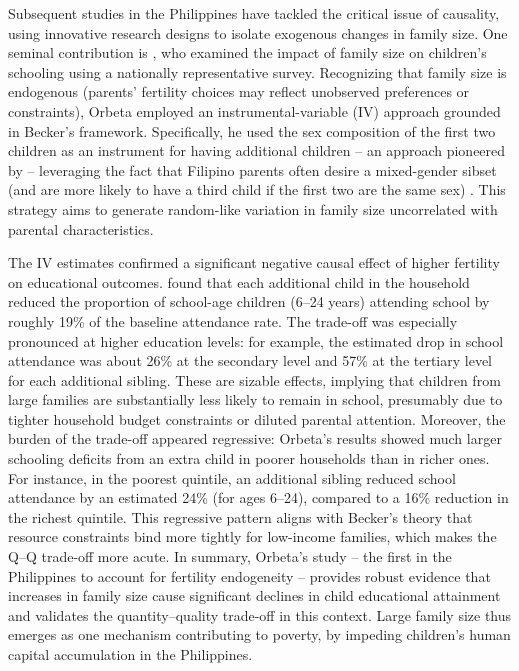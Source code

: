 \documentclass[]{AEA}
\begin{document}
Subsequent studies in the Philippines have tackled the critical issue of
causality, using innovative research designs to isolate exogenous
changes in family size. One seminal contribution is
\citet{orbeta2010number}, who examined the impact of family size on
children's schooling using a nationally representative survey.
Recognizing that family size is endogenous (parents' fertility choices
may reflect unobserved preferences or constraints), Orbeta employed an
instrumental-variable (IV) approach grounded in Becker's framework.
Specifically, he used the sex composition of the first two children as
an instrument for having additional children -- an approach pioneered by
\citet{angrist1996children} -- leveraging the fact that Filipino parents
often desire a mixed-gender sibset (and are more likely to have a third
child if the first two are the same sex) \citep{vicerra2013fertility}.
This strategy aims to generate random-like variation in family size
uncorrelated with parental characteristics.

The IV estimates confirmed a significant negative causal effect of
higher fertility on educational outcomes. \citet{orbeta2010number} found
that each additional child in the household reduced the proportion of
school-age children (6--24 years) attending school by roughly 19\% of
the baseline attendance rate. The trade-off was especially pronounced at
higher education levels: for example, the estimated drop in school
attendance was about 26\% at the secondary level and 57\% at the
tertiary level for each additional sibling. These are sizable effects,
implying that children from large families are substantially less likely
to remain in school, presumably due to tighter household budget
constraints or diluted parental attention. Moreover, the burden of the
trade-off appeared regressive: Orbeta's results showed much larger
schooling deficits from an extra child in poorer households than in
richer ones. For instance, in the poorest quintile, an additional
sibling reduced school attendance by an estimated 24\% (for ages 6--24),
compared to a 16\% reduction in the richest quintile. This regressive
pattern aligns with Becker's theory that resource constraints bind more
tightly for low-income families, which makes the Q--Q trade-off more
acute. In summary, Orbeta's study -- the first in the Philippines to
account for fertility endogeneity -- provides robust evidence that
increases in family size cause significant declines in child educational
attainment and validates the quantity--quality trade-off in this
context. Large family size thus emerges as one mechanism contributing to
poverty, by impeding children's human capital accumulation in the
Philippines.
\end{document}

